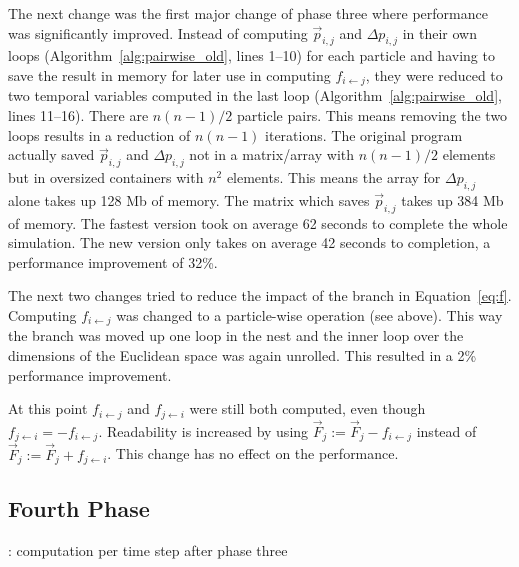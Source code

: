 \documentclass[twoside,11pt]{article}
\begin{document}
The next change was the first major change of phase three where
performance was significantly improved.
Instead of computing $\vec{p}_{i,j}$ and $\Delta p_{i,j}$ in their
own loops (Algorithm~\ref{alg:pairwise_old}, lines 1--10) for each
particle and having to save the result in memory for later use in
computing $f_{i \leftarrow j}$, they were reduced to two temporal
variables computed in the last loop (Algorithm~\ref{alg:pairwise_old},
lines 11--16).
There are $n(n-1)/2$ particle pairs.
This means removing the two loops results in a reduction of $n(n-1)$
iterations.
The original program actually saved $\vec{p}_{i,j}$ and
$\Delta p_{i,j}$ not in a matrix/array with $n(n-1)/2$ elements but
in oversized containers with $n^2$ elements.
This means the array for $\Delta p_{i,j}$ alone takes up 128 Mb
of memory.
The matrix which saves $\vec{p}_{i,j}$ takes up 384 Mb of memory.
The fastest version took on average 62 seconds to complete the whole
simulation.
The new version only takes on average 42 seconds to completion, a
performance improvement of 32\%.

The next two changes tried to reduce the impact of the branch in
Equation~\ref{eq:f}.
Computing $f_{i \leftarrow j}$ was changed to a particle-wise
operation (see above).
This way the branch was moved up one loop in the nest and the inner
loop over the dimensions of the Euclidean space was again unrolled.
This resulted in a 2\% performance improvement.

At this point $f_{i \leftarrow j}$ and $f_{j \leftarrow i}$ were
still both computed, even though
$f_{j \leftarrow i} = -f_{i \leftarrow j}$.
Readability is increased by using
$\vec{F}_j := \vec{F}_j - f_{i \leftarrow j}$ instead of
$\vec{F}_j := \vec{F}_j + f_{j \leftarrow i}$.
This change has no effect on the performance.


\subsection{Fourth Phase} %

\begin{algorithm} %
  \caption{: computation per time step after phase three}
  \label{alg:new}

  \begin{algorithmic}[1]

      \ENDFOR
    \ENDFOR

    \ENDFOR

  \end{algorithmic}
\end{algorithm} %
\end{document}
